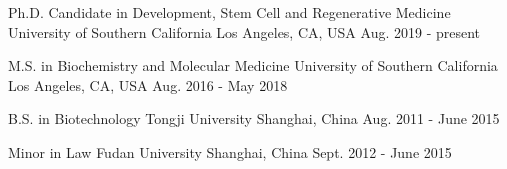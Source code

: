 

\begin{cventries}

\cventryshort
    {Ph.D. Candidate in Development, Stem Cell and Regenerative Medicine} %
    {University of Southern California} %
    {Los Angeles, CA, USA} %
    {Aug. 2019 - present} %
    

\cventryshort
    {M.S. in Biochemistry and Molecular Medicine} %
    {University of Southern California} %
    {Los Angeles, CA, USA} %
    {Aug. 2016 - May 2018} %
    
\cventryshort
    {B.S. in Biotechnology} %
    {Tongji University} %
    {Shanghai, China} %
    {Aug. 2011 - June 2015} %

\cventryshort
    {Minor in Law} %
    {Fudan University} %
    {Shanghai, China} %
    {Sept. 2012 - June 2015} %
\end{cventries}

